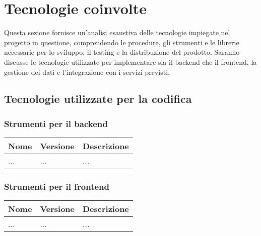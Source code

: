 

\section{Tecnologie coinvolte}
\label{sec:tecnologie_coinvolte}

Questa sezione fornisce un’analisi esaustiva delle tecnologie impiegate nel progetto in questione, comprendendo le procedure, gli
strumenti e le librerie necessarie per lo sviluppo, il testing e la distribuzione del prodotto. Saranno discusse le tecnologie
utilizzate per implementare sia il backend che il frontend, la gestione dei dati e l’integrazione con i servizi previsti.


\subsection{Tecnologie utilizzate per la codifica}

\subsubsection{Strumenti per il backend}
\begin{table}[h!]
    \centering
    \renewcommand{\arraystretch}{1.6} %
    \begin{tabularx}{\textwidth}{|p{2cm}|p{2cm}|X|} \hline
    \rowcolor[HTML]{FFD700} 
    \textbf{Nome} & \textbf{Versione} & \textbf{Descrizione} \\ \hline
    ... & ... & ... \\ \hline
    \end{tabularx}
\end{table}

\subsubsection{Strumenti per il frontend}
\begin{table}[h!]
    \centering
    \renewcommand{\arraystretch}{1.6} %
    \begin{tabularx}{\textwidth}{|p{2cm}|p{2cm}|X|} \hline
    \rowcolor[HTML]{FFD700} 
    \textbf{Nome} & \textbf{Versione} & \textbf{Descrizione} \\ \hline
    ... & ... & ... \\ \hline
    \end{tabularx}
\end{table}

